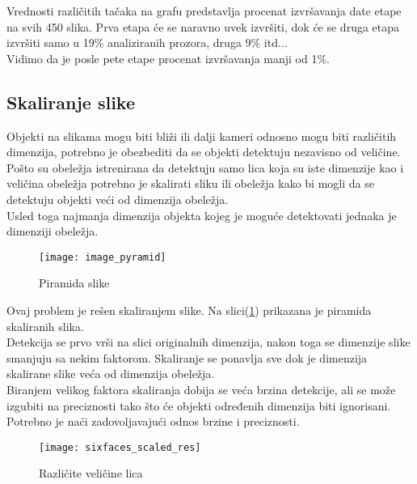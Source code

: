 Vrednosti različitih tačaka na grafu predstavlja procenat izvršavanja date etape
na svih 450 slika. Prva etapa će se naravno uvek izvršiti, dok će se druga etapa
izvršiti samo u 19\% analiziranih prozora, druga 9\% itd... \\
Vidimo da je posle pete etape procenat izvršavanja manji od 1\%. \\

\subsection{Skaliranje slike}\label{image_scaling}

Objekti na slikama mogu biti bliži ili dalji kameri odnosno mogu biti
različitih dimenzija, potrebno je obezbediti da se objekti detektuju nezavisno od
veličine. \\

Pošto su obeležja istrenirana da detektuju samo lica koja su iste dimenzije kao
i veličina obeležja potrebno je skalirati sliku ili obeležja kako bi
mogli da se detektuju objekti veći od dimenzija obeležja. \\
Usled toga najmanja dimenzija objekta kojeg je moguće detektovati jednaka je dimenziji obeležja.

\begin{figure}[H]
  \centering
  \texttt{[image: image\_pyramid]}
  \caption{Piramida slike\cite{ImagePyramid_web}}
  \label{image_pyramid}
\end{figure}

Ovaj problem je rešen skaliranjem slike.
Na slici(\ref{image_pyramid}) prikazana je piramida skaliranih slika. \\
Detekcija se prvo vrši na slici originalnih dimenzija, nakon toga se dimenzije
slike smanjuju sa nekim faktorom.
Skaliranje se ponavlja sve dok je dimenzija skalirane slike veća od dimenzija
obeležja. \\

Biranjem velikog faktora skaliranja dobija se veća brzina detekcije, ali se može
izgubiti na preciznosti tako što će objekti određenih dimenzija biti ignorisani. \\
Potrebno je naći zadovoljavajući odnos brzine i preciznosti. \\

\begin{figure}[H]
  \centering
  \texttt{[image: sixfaces\_scaled\_res]}
  \caption{Različite veličine lica}
  \label{sixfaces_scaled}
\end{figure}

